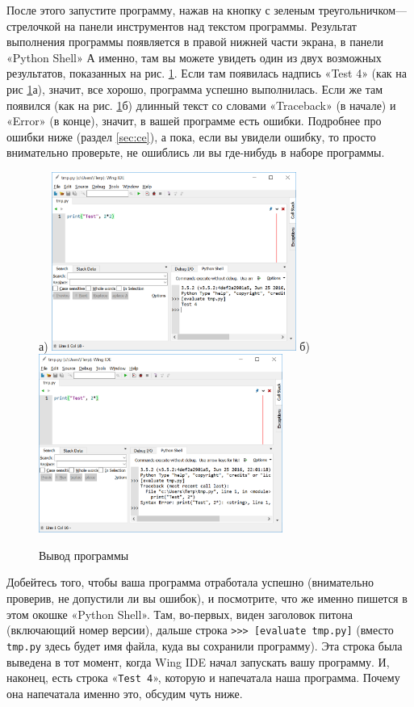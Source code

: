 После этого запустите программу, нажав на кнопку с зеленым треугольничком---стрелочкой на панели инструментов над 
текстом программы. Результат выполнения программы появляется в правой нижней части экрана, в панели «Python Shell»
А именно, там вы можете увидеть один из двух возможных результатов, показанных на рис. \ref{output}.
Если там появилась надпись «Test 4» (как на рис \ref{output}а), значит, все хорошо, программа успешно выполнилась. 
Если же там появился  (как на рис. \ref{output}б) длинный текст со словами «Traceback» (в начале) 
и «Error» (в конце), значит, в вашей программе есть ошибки.
Подробнее про ошибки ниже (раздел \ref{sec:ce}), а пока, если вы увидели ошибку,
то просто внимательно проверьте, не ошиблись ли вы где-нибудь в наборе программы. 

\begin{figure}
\centerline{
а) \includegraphics[width=8cm]{0_quick_start/wing_ide_2.png} \qquad
б) \includegraphics[width=8cm]{0_quick_start/wing_ide_3.png}
}
\caption{Вывод программы}
\label{output}
\end{figure}

Добейтесь того, чтобы ваша программа отработала успешно (внимательно проверив, не допустили ли вы ошибок), 
и посмотрите, что же именно пишется в этом окошке «Python Shell».
Там, во-первых, виден заголовок питона (включающий номер версии), дальше строка \verb`>>> [evaluate tmp.py]` 
(вместо \verb`tmp.py` здесь будет имя файла, куда вы сохранили программу). 
Эта строка была выведена в тот момент, когда Wing IDE начал запускать вашу программу. 
И, наконец, есть строка «\verb`Test 4`», которую и напечатала наша программа. 
Почему она напечатала именно это, обсудим чуть ниже.

